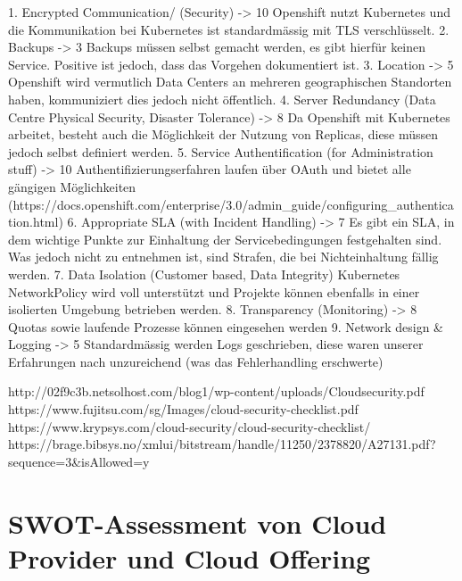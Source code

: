\documentclass[12pt,a4paper]{article}
\begin{document}
1. Encrypted Communication/ (Security) -> 10
Openshift nutzt Kubernetes und die Kommunikation bei Kubernetes ist standardmässig mit TLS verschlüsselt.
2. Backups -> 3
Backups müssen selbst gemacht werden, es gibt hierfür keinen Service. Positive ist jedoch, dass das Vorgehen dokumentiert ist.
3. Location -> 5
Openshift wird vermutlich Data Centers an mehreren geographischen Standorten haben, kommuniziert dies jedoch nicht öffentlich.
4. Server Redundancy (Data Centre Physical Security, Disaster Tolerance) -> 8
Da Openshift mit Kubernetes arbeitet, besteht auch die Möglichkeit der Nutzung von Replicas, diese müssen jedoch selbst definiert werden.
5. Service Authentification (for Administration stuff) -> 10
Authentifizierungserfahren laufen über OAuth und bietet alle gängigen Möglichkeiten (https://docs.openshift.com/enterprise/3.0/admin_guide/configuring_authentication.html)
6. Appropriate SLA (with Incident Handling) -> 7
Es gibt ein SLA, in dem wichtige Punkte zur Einhaltung der Servicebedingungen festgehalten sind. Was jedoch nicht zu entnehmen ist, sind Strafen, die bei Nichteinhaltung fällig werden.
7. Data Isolation (Customer based, Data Integrity)
Kubernetes NetworkPolicy wird voll unterstützt und Projekte können ebenfalls in einer isolierten Umgebung betrieben werden.
8. Transparency (Monitoring) -> 8
Quotas sowie laufende Prozesse können eingesehen werden
9. Network design & Logging -> 5
Standardmässig werden Logs geschrieben, diese waren unserer Erfahrungen nach unzureichend (was das Fehlerhandling erschwerte)

http://02f9c3b.netsolhost.com/blog1/wp-content/uploads/Cloudsecurity.pdf
https://www.fujitsu.com/sg/Images/cloud-security-checklist.pdf
https://www.krypsys.com/cloud-security/cloud-security-checklist/
https://brage.bibsys.no/xmlui/bitstream/handle/11250/2378820/A27131.pdf?sequence=3&isAllowed=y

\section{SWOT-Assessment von Cloud Provider und Cloud Offering}
\end{document}
